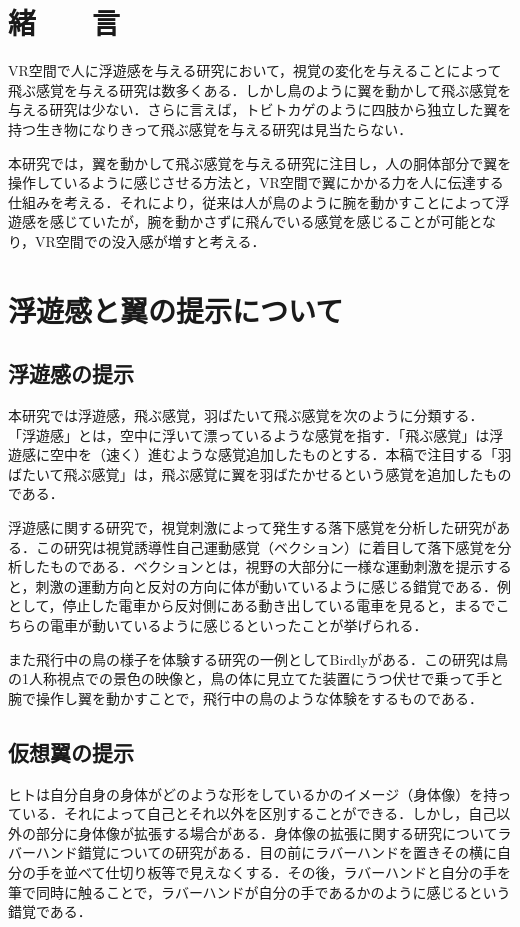 \begin{small}
\section{緒　　言}
  VR空間で人に浮遊感を与える研究において，視覚の変化を与えることによって飛ぶ感覚を与える研究は数多くある．しかし鳥のように翼を動かして飛ぶ感覚を与える研究は少ない．さらに言えば，トビトカゲのように四肢から独立した翼を持つ生き物になりきって飛ぶ感覚を与える研究は見当たらない．

  本研究では，翼を動かして飛ぶ感覚を与える研究に注目し，人の胴体部分で翼を操作しているように感じさせる方法と，VR空間で翼にかかる力を人に伝達する仕組みを考える．それにより，従来は人が鳥のように腕を動かすことによって浮遊感を感じていたが，腕を動かさずに飛んでいる感覚を感じることが可能となり，VR空間での没入感が増すと考える．


\section{浮遊感と翼の提示について}
  \subsection{浮遊感の提示}
    本研究では浮遊感，飛ぶ感覚，羽ばたいて飛ぶ感覚を次のように分類する．
    「浮遊感」とは，空中に浮いて漂っているような感覚を指す．「飛ぶ感覚」は浮遊感に空中を（速く）進むような感覚追加したものとする．本稿で注目する「羽ばたいて飛ぶ感覚」は，飛ぶ感覚に翼を羽ばたかせるという感覚を追加したものである．

    浮遊感に関する研究で，視覚刺激によって発生する落下感覚を分析した研究がある\cite{奥川夏輝2017VR空間における視覚刺激によって発生する落下感覚の分析}．この研究は視覚誘導性自己運動感覚（ベクション）に着目して落下感覚を分析したものである．ベクションとは，視野の大部分に一様な運動刺激を提示すると，刺激の運動方向と反対の方向に体が動いているように感じる錯覚である\cite{妹尾武治2014ベクションとその周辺の近年の動向}．例として，停止した電車から反対側にある動き出している電車を見ると，まるでこちらの電車が動いているように感じるといったことが挙げられる．

    また飛行中の鳥の様子を体験する研究の一例としてBirdly\cite{rheiner2014birdly}がある．この研究は鳥の1人称視点での景色の映像と，鳥の体に見立てた装置にうつ伏せで乗って手と腕で操作し翼を動かすことで，飛行中の鳥のような体験をするものである．

  \subsection{仮想翼の提示}
    ヒトは自分自身の身体がどのような形をしているかのイメージ（身体像）を持っている．それによって自己とそれ以外を区別することができる．しかし，自己以外の部分に身体像が拡張する場合がある．身体像の拡張に関する研究についてラバーハンド錯覚についての研究がある\cite{botvinick1998rubber}．目の前にラバーハンドを置きその横に自分の手を並べて仕切り板等で見えなくする．その後，ラバーハンドと自分の手を筆で同時に触ることで，ラバーハンドが自分の手であるかのように感じるという錯覚である．


\end{small}

